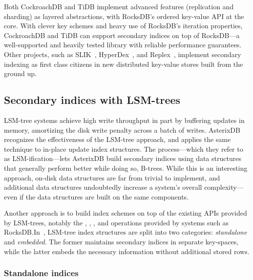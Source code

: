 Both CockroachDB and TiDB implement advanced features (\eg replication and
sharding) as layered abstractions, with RocksDB's ordered key-value API at the
core. With clever key schemes and heavy use of RocksDB's iteration properties,
CockroachDB and TiDB can support secondary indices on top of RocksDB---a
well-supported and heavily tested library with reliable performance guarantees.
Other projects, such as SLIK~\cite{slik}, HyperDex~\cite{hyperdex}, and
Replex~\cite{replex}, implement secondary indexing as first class citizens in
new distributed key-value stores built from the ground up.

\subsection{Secondary indices with LSM-trees}

LSM-tree systems achieve high write throughput in part by buffering updates in
memory, amortizing the disk write penalty across a batch of writes.
AsterixDB~\cite{asterix-storage} recognizes the effectiveness of the LSM-tree
approach, and applies the same technique to in-place update index structures.
The process---which they refer to as LSM-ification---lets AsterixDB build
secondary indices using data structures that generally perform better while
doing so, \eg B-trees. While this is an interesting approach, on-disk data
structures are far from trivial to implement, and additional data structures
undoubtedly increase a system's overall complexity---even if the data structures
are built on the same components.


Another approach is to build index schemes on top of the existing APIs provided
by LSM-trees, notably the , , , and 
operations provided by systems such as RocksDB.\@ In~\cite{lsm-comparison},
LSM-tree index structures are split into two categories: \textit{standalone} and
\textit{embedded}. The former maintains secondary indices in separate
key-spaces, while the latter embeds the necessary information without additional
stored rows.

\subsubsection{Standalone indices}


